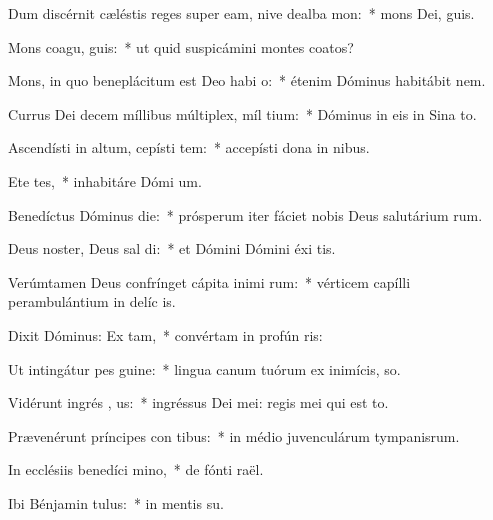 \item Dum discérnit cæléstis reges super eam, nive dealba  mon:~* mons Dei,  guis.
\item Mons coagu,  guis:~* ut quid suspicámini montes coatos?
\item Mons, in quo beneplácitum est Deo habi  o:~* étenim Dóminus habitábit  nem.
\item Currus Dei decem míllibus múltiplex, míl tium:~* Dóminus in eis in Sina  to.
\item Ascendísti in altum, cepísti tem:~* accepísti dona in nibus.
\item Ete  tes,~* inhabitáre Dómi um.
\item Benedíctus Dóminus  die:~* prósperum iter fáciet nobis Deus salutárium rum.
\item Deus noster, Deus sal di:~* et Dómini Dómini éxi tis.
\item Verúmtamen Deus confrínget cápita inimi rum:~* vérticem capílli perambulántium in delíc is.
\item Dixit Dóminus: Ex  tam,~* convértam in profún ris:
\item Ut intingátur pes   guine:~* lingua canum tuórum ex inimícis,  so.
\item Vidérunt ingrés , us:~* ingréssus Dei mei: regis mei qui est  to.
\item Prævenérunt príncipes con tibus:~* in médio juvenculárum tympanisrum.
\item In ecclésiis benedíci  mino,~* de fónti raël.
\item Ibi Bénjamin tulus:~* in mentis su.
